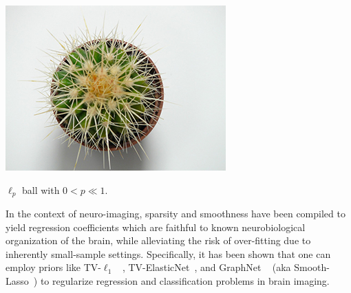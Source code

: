 \begin{marginfigure}[4cm]
  \centering
  \includegraphics[width=1\linewidth]{figures/ball.jpg}
  \caption{$\ell_p$ ball with $0 < p \ll 1$.}
  \label{fig:flower}
\end{marginfigure}

In the context of neuro-imaging, sparsity and smoothness have been compiled to yield
regression coefficients which are faithful to known neurobiological organization of the brain,
while alleviating the risk of over-fitting due to inherently small-sample settings.
Specifically, it has been shown that one can employ priors like TV-$\ell_1$
~\citep{baldassarre2012,gramfort2013}, TV-ElasticNet~\citep{dubois2014predictive},
and GraphNet ~\citep{grosenick2013}
(aka Smooth-Lasso~\citep{hebiri2011})
to regularize regression and classification
problems in brain imaging.

